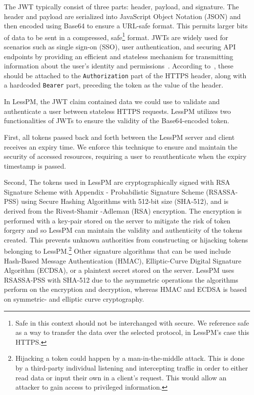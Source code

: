 The JWT typically consist of three parts: header, payload, and signature.
The header and payload are serialized into JavaScript Object Notation (JSON)
and then encoded using Base64 to ensure a URL-safe format.
This permits larger bits of data to be sent in a compressed, safe\footnote{
  Safe in this context should not be interchanged with secure.
  We reference safe as a way to transfer the data over the selected protocol,
  in LessPM's case this HTTPS.
} format.
JWTs are widely used for scenarios such as single sign-on (SSO), user
authentication, and securing API endpoints by providing an efficient and
stateless mechanism for transmitting information about the user's identity
and permissions~\cite{karande2018securingnode}.
According to~\cite{RFC7519}, these should be attached to the
\texttt{Authorization} part of the HTTPS header, along with a hardcoded
\texttt{Bearer} part, preceding the token as the value of the header.

In LessPM, the JWT claim contained data we could use to validate and
authenticate a user between stateless HTTPS requests.
LessPM utilizes two functionalities of JWTs to ensure the validity of the
Base64-encoded token.

First, all tokens passed back and forth between the LessPM server and client
receives an expiry time.
We enforce this technique to ensure and maintain the security of accessed
resources, requiring a user to reauthenticate when the expiry timestamp is
passed.

Second, The tokens used in LessPM are cryptographically signed with RSA
Signature Scheme with Appendix - Probabilistic Signature Scheme (RSASSA-PSS)
using Secure Hashing Algorithms with 512-bit size (SHA-512), and is derived
from the Rivest-Shamir -Adleman (RSA) encryption.
The encryption is performed with a key-pair stored on the server to mitigate
the risk of token forgery and so LessPM can maintain the validity and
authenticity of the tokens created.
This prevents unknown authorities from constructing or hijacking tokens
belonging to LessPM\@.\footnote{
  Hijacking a token could happen by a man-in-the-middle attack.
  This is done by a third-party individual listening and intercepting traffic
  in order to either read data or input their own in a client's request.
  This would allow an attacker to gain access to privileged information.
}
Other signature algorithms that can be used include Hash-Based Message
Authentication (HMAC), Elliptic-Curve Digital Signature Algorithm (ECDSA), or
a plaintext secret stored on the server.
LessPM uses RSASSA-PSS with SHA-512 due to the asymmetric operations the
algorithms perform on the encryption and decryption, whereas HMAC and ECDSA is
based on symmetric- and elliptic curve cryptography.


